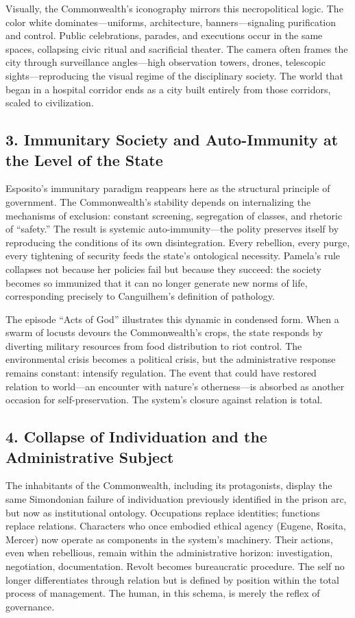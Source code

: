 \documentclass[11pt]{article}
\begin{document}
Visually, the Commonwealth’s iconography mirrors this necropolitical logic.  The color white dominates—uniforms, architecture, banners—signaling purification and control.  Public celebrations, parades, and executions occur in the same spaces, collapsing civic ritual and sacrificial theater.  The camera often frames the city through surveillance angles—high observation towers, drones, telescopic sights—reproducing the visual regime of the disciplinary society.  The world that began in a hospital corridor ends as a city built entirely from those corridors, scaled to civilization.  
\subsection*{3. Immunitary Society and Auto-Immunity at the Level of the State}
\label{sec:org976c59c}

Esposito’s immunitary paradigm reappears here as the structural principle of government.  The Commonwealth’s stability depends on internalizing the mechanisms of exclusion: constant screening, segregation of classes, and rhetoric of “safety.”  The result is systemic auto-immunity—the polity preserves itself by reproducing the conditions of its own disintegration.  Every rebellion, every purge, every tightening of security feeds the state’s ontological necessity.  Pamela’s rule collapses not because her policies fail but because they succeed: the society becomes so immunized that it can no longer generate new norms of life, corresponding precisely to Canguilhem’s definition of pathology.  

The episode “Acts of God” illustrates this dynamic in condensed form.  When a swarm of locusts devours the Commonwealth’s crops, the state responds by diverting military resources from food distribution to riot control.  The environmental crisis becomes a political crisis, but the administrative response remains constant: intensify regulation.  The event that could have restored relation to world—an encounter with nature’s otherness—is absorbed as another occasion for self-preservation.  The system’s closure against relation is total.  
\subsection*{4. Collapse of Individuation and the Administrative Subject}
\label{sec:org0df2d1c}

The inhabitants of the Commonwealth, including its protagonists, display the same Simondonian failure of individuation previously identified in the prison arc, but now as institutional ontology.  Occupations replace identities; functions replace relations.  Characters who once embodied ethical agency (Eugene, Rosita, Mercer) now operate as components in the system’s machinery.  Their actions, even when rebellious, remain within the administrative horizon: investigation, negotiation, documentation.  Revolt becomes bureaucratic procedure.  The self no longer differentiates through relation but is defined by position within the total process of management.  The human, in this schema, is merely the reflex of governance.  
\end{document}
